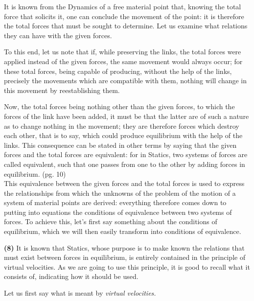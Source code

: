\documentclass{book}
\begin{document}
It is known from the Dynamics of a free material point that, knowing the total force that solicits it, one can conclude the movement of the point: it is therefore the total forces that must be sought to determine. Let us examine what relations they can have with the given forces.

To this end, let us note that if, while preserving the links, the total forces were applied instead of the given forces, the same movement would always occur; for these total forces, being capable of producing, without the help of the links, precisely the movements which are compatible with them, nothing will change in this movement by reestablishing them.

Now, the total forces being nothing other than the given forces, to which the forces of the link have been added, it must be that the latter are of such a nature as to change nothing in the movement; they are therefore forces which destroy each other, that is to say, which could produce equilibrium with the help of the links. This consequence can be stated in other terms by saying that the given forces and the total forces are equivalent: for in Statics, two systems of forces are called equivalent, such that one passes from one to the other by adding forces in equilibrium.
\newpage
(pg. 10)\\
This equivalence between the given forces and the total forces is used to express the relationships from which the unknowns of the problem of the motion of a system of material points are derived: everything therefore comes down to putting into equations the conditions of equivalence between two systems of forces. To achieve this, let's first say something about the conditions of equilibrium, which we will then easily transform into conditions of equivalence.

\textbf{(8)} It is known that Statics, whose purpose is to make known the relations that must exist between forces in equilibrium, is entirely contained in the principle of virtual velocities. As we are going to use this principle, it is good to recall what it consists of, indicating how it should be used.

Let us first say what is meant by \textit{virtual velocities.}
\end{document}
